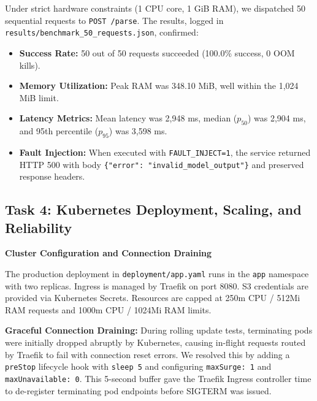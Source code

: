 \documentclass[10pt,a4paper]{article}
\begin{document}
Under strict hardware constraints (1 CPU core, 1 GiB RAM), we dispatched 50 sequential requests to \texttt{POST /parse}. The results, logged in \texttt{results/benchmark\_50\_requests.json}, confirmed:
\begin{itemize}
    \item \textbf{Success Rate:} 50 out of 50 requests succeeded (100.0\% success, 0 OOM kills).
    \item \textbf{Memory Utilization:} Peak RAM was 348.10 MiB, well within the 1,024 MiB limit.
    \item \textbf{Latency Metrics:} Mean latency was 2,948 ms, median ($p_{50}$) was 2,904 ms, and 95th percentile ($p_{95}$) was 3,598 ms.
    \item \textbf{Fault Injection:} When executed with \texttt{FAULT\_INJECT=1}, the service returned HTTP 500 with body \texttt{\{"error": "invalid\_model\_output"\}} and preserved response headers.
\end{itemize}

\clearpage

\subsection*{Task 4: Kubernetes Deployment, Scaling, and Reliability}

\textbf{Cluster Configuration and Connection Draining}

The production deployment in \texttt{deployment/app.yaml} runs in the \texttt{app} namespace with two replicas. Ingress is managed by Traefik on port 8080. S3 credentials are provided via Kubernetes Secrets. Resources are capped at 250m CPU / 512Mi RAM requests and 1000m CPU / 1024Mi RAM limits.

\textbf{Graceful Connection Draining:} During rolling update tests, terminating pods were initially dropped abruptly by Kubernetes, causing in-flight requests routed by Traefik to fail with connection reset errors. We resolved this by adding a \texttt{preStop} lifecycle hook with \texttt{sleep 5} and configuring \texttt{maxSurge: 1} and \texttt{maxUnavailable: 0}. This 5-second buffer gave the Traefik Ingress controller time to de-register terminating pod endpoints before SIGTERM was issued.
\end{document}
